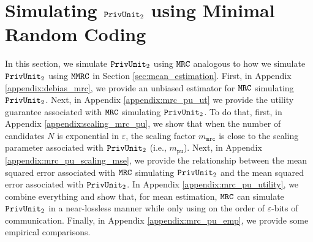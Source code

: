 \section{Simulating \texorpdfstring{$\texttt{PrivUnit}_2$}{PrivUnit} using Minimal Random Coding}\label{appendix:mrc_pu}

In this section, we simulate $\texttt{PrivUnit}_2$ using $\texttt{MRC}$ analogous to how we simulate $\texttt{PrivUnit}_2$ using $\texttt{MMRC}$ in Section \ref{sec:mean_estimation}. First, in Appendix \ref{appendix:debias_mrc}, we provide an unbiased estimator for $\texttt{MRC}$ simulating $\texttt{PrivUnit}_2$.
Next, in Appendix \ref{appendix:mrc_pu_ut} we provide the utility guarantee associated with $\texttt{MRC}$ simulating $\texttt{PrivUnit}_2$. To do that, first, in Appendix \ref{appendix:scaling_mrc_pu}, we show that when the number of candidates $N$ is exponential in $\varepsilon$, the scaling factor $m_{\texttt{mrc}}$ is close to the scaling parameter associated with $\texttt{PrivUnit}_2$ (i.e., $m_{\texttt{pu}}$). Next, in Appendix \ref{appendix:mrc_pu_scaling_mse}, we provide the relationship between the mean squared error associated with $\texttt{MRC}$ simulating $\texttt{PrivUnit}_2$ and the mean squared error associated with $\texttt{PrivUnit}_2$. In Appendix \ref{appendix:mrc_pu_utility}, we combine everything and show that, for mean estimation, $\texttt{MRC}$ can simulate $\texttt{PrivUnit}_2$ in a near-lossless manner while only using on the order of $\varepsilon$-bits of communication. Finally, in Appendix \ref{appendix:mrc_pu_emp}, we provide some empirical comparisons.




